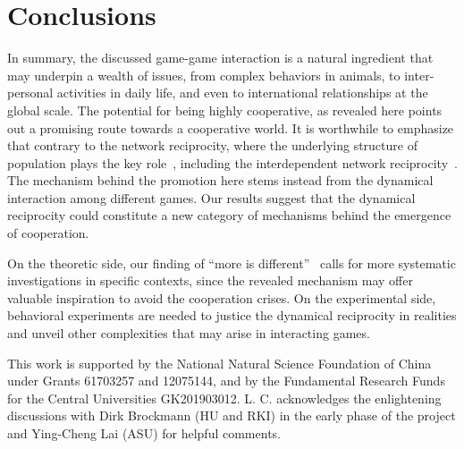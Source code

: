 \documentclass[doublecol]{epl2}
\begin{document}
\section{Conclusions}
In summary, the discussed game-game interaction is a natural ingredient that may underpin a wealth of issues, from complex behaviors in animals, to inter-personal activities in daily life, and even to international relationships at the global scale. The potential for being highly cooperative, as revealed here points out a promising route towards a cooperative world. It is worthwhile to emphasize that contrary to the network reciprocity, where the underlying structure of population plays the key role~\cite{nowak1992evolutionary,szabo2007evolutionary}, including the interdependent network reciprocity~\cite{Wang2013interdependent,jin2014spontaneous,xia2015heterogeneous}. The mechanism behind the promotion here stems instead from the dynamical interaction among different games. Our results suggest that the dynamical reciprocity could constitute a new category of mechanisms behind the emergence of cooperation.

On the theoretic side, our finding of ``more is different''~\cite{anderson1972more} calls for more systematic investigations in specific contexts, since the revealed mechanism may offer valuable inspiration to avoid the cooperation crises. On the experimental side, behavioral experiments are needed to justice the dynamical reciprocity in realities and unveil other complexities that may arise in interacting games.

\acknowledgments
This work is supported by the National Natural Science Foundation of China under Grants 61703257 and 12075144, and by the Fundamental Research Funds for the Central Universities GK201903012. L. C. acknowledges the enlightening discussions with Dirk Brockmann (HU and RKI) in the early phase of the project and Ying-Cheng Lai (ASU) for helpful comments.
\end{document}
